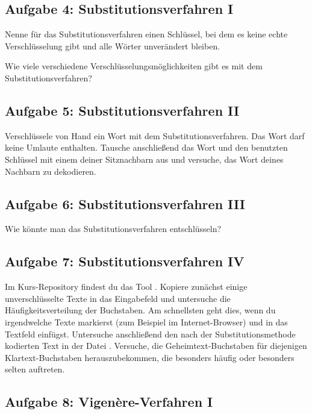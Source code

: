 \subsection{Aufgabe 4: Substitutionsverfahren I}

\begin{compactenum}[a)]
\item Nenne für das Substitutionsverfahren einen Schlüssel, bei dem es keine
echte Verschlüsselung gibt und alle Wörter unverändert bleiben.
\item Wie viele verschiedene Verschlüsselungsmöglichkeiten gibt es mit dem
Substitutionsverfahren?
\end{compactenum}


\subsection{Aufgabe 5: Substitutionsverfahren II}

Verschlüssele von Hand ein Wort mit dem Substitutionsverfahren. Das Wort darf
keine Umlaute enthalten. Tausche anschließend das Wort und den benutzten
Schlüssel mit einem deiner Sitznachbarn aus und versuche, das Wort deines
Nachbarn zu dekodieren.


\subsection{Aufgabe 6: Substitutionsverfahren III}

Wie könnte man das Substitutionsverfahren entschlüsseln?


\subsection{Aufgabe 7: Substitutionsverfahren IV}

Im Kurs-Repository findest du das Tool . Kopiere
zunächst einige unverschlüsselte Texte in das Eingabefeld und untersuche die
Häufigkeitsverteilung der Buchstaben. Am schnellsten geht dies, wenn du
irgendwelche Texte markierst (zum Beispiel im Internet-Browser) und in das
Textfeld einfügst. Untersuche anschließend den nach der Substitutionsmethode
kodierten Text in der Datei . Versuche, die
Geheimtext-Buchstaben für diejenigen Klartext-Buchstaben herauszubekommen, die
besonders häufig oder besonders selten auftreten.


\subsection{Aufgabe 8: Vigenère-Verfahren I}

